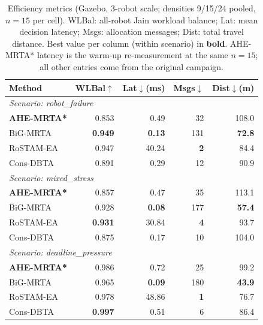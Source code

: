 \begin{table}[t]
\centering
\caption{Efficiency metrics (Gazebo, 3-robot scale; densities 9/15/24 pooled, $n{=}15$ per cell). WLBal: all-robot Jain workload balance; Lat: mean decision latency; Msgs: allocation messages; Dist: total travel distance. Best value per column (within scenario) in \textbf{bold}. AHE-MRTA* latency is the warm-up re-measurement at the same $n{=}15$; all other entries come from the original campaign.}
\label{tab:efficiency}
\small
\begin{tabular}{lrrrr}
\toprule
\textbf{Method} & \textbf{WLBal$\uparrow$} & \textbf{Lat$\downarrow$(ms)} & \textbf{Msgs$\downarrow$} & \textbf{Dist$\downarrow$(m)} \\
\midrule
\multicolumn{5}{l}{\textit{Scenario: robot\_failure}} \\
\textbf{AHE-MRTA*} & 0.853 & 0.49 & 32 & 108.0 \\
BiG-MRTA & \textbf{0.949} & \textbf{0.13} & 131 & \textbf{72.8} \\
RoSTAM-EA & 0.947 & 40.24 & \textbf{2} & 84.4 \\
Cons-DBTA & 0.891 & 0.29 & 12 & 90.9 \\
\midrule
\multicolumn{5}{l}{\textit{Scenario: mixed\_stress}} \\
\textbf{AHE-MRTA*} & 0.857 & 0.47 & 35 & 113.1 \\
BiG-MRTA & 0.928 & \textbf{0.08} & 177 & \textbf{57.4} \\
RoSTAM-EA & \textbf{0.931} & 30.84 & \textbf{4} & 93.7 \\
Cons-DBTA & 0.875 & 0.17 & 10 & 104.0 \\
\midrule
\multicolumn{5}{l}{\textit{Scenario: deadline\_pressure}} \\
\textbf{AHE-MRTA*} & 0.986 & 0.72 & 25 & 99.2 \\
BiG-MRTA & 0.965 & \textbf{0.09} & 180 & \textbf{43.9} \\
RoSTAM-EA & 0.978 & 48.86 & \textbf{1} & 76.7 \\
Cons-DBTA & \textbf{0.997} & 0.51 & 6 & 86.4 \\
\bottomrule
\end{tabular}
\end{table}
